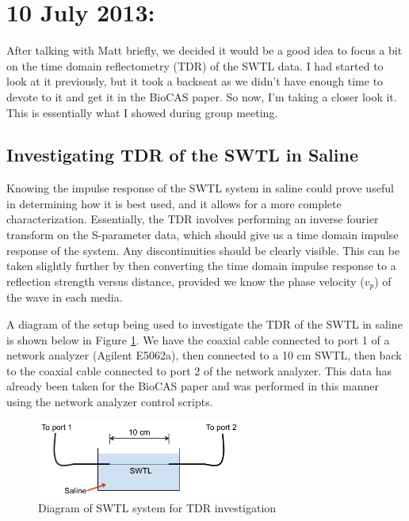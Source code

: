 \documentclass[12pt,onecolumn,titlepage]{article}
\begin{document}
\section{10 July 2013:}

\indent \indent After talking with Matt briefly, we decided it would be a good idea to focus a bit on the time domain reflectometry (TDR) of the SWTL data. I had started to look at it previously, but it took a backseat as we didn't have enough time to devote to it and get it in the BioCAS paper. So now, I'm taking a closer look it. This is essentially what I showed during group meeting.

\subsection{Investigating TDR of the SWTL in Saline}
\indent \indent Knowing the impulse response of the SWTL system in saline could prove useful in determining how it is best used, and it allows for a more complete characterization. Essentially, the TDR involves performing an inverse fourier transform on the S-parameter data, which should give us a time domain impulse response of the system. Any discontinuities should be clearly visible. This can be taken slightly further by then converting the time domain impulse response to a reflection strength versus distance, provided we know the phase velocity ($v_p$) of the wave in each media. 

A diagram of the setup being used to investigate the TDR of the SWTL in saline is shown below in Figure \ref{fig:SWTL_TDR_diagram}. We have the coaxial cable connected to port 1 of a network analyzer (Agilent E5062a), then connected to a 10 cm SWTL, then back to the coaxial cable connected to port 2 of the network analyzer. This data has already been taken for the BioCAS paper and was performed in this manner using the network analyzer control scripts. 


\begin{figure}[htbp]
	\centering
	\includegraphics[width=0.6\textwidth]{Pictures/10July2013/SWTL_TDR_diagram}
	\caption{ Diagram of SWTL system for TDR investigation } 
	\label{fig:SWTL_TDR_diagram}
\end{figure}
\end{document}
